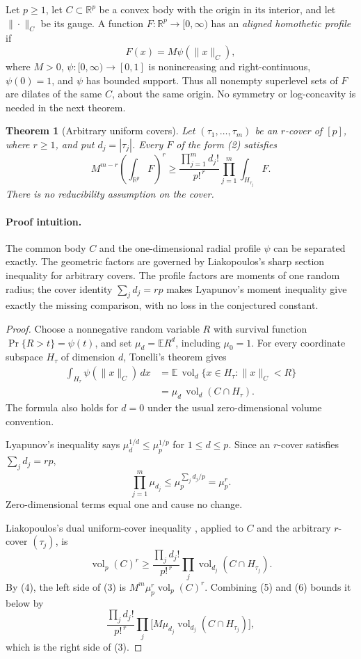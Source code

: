 \documentclass[11pt]{article}
\newtheorem{theorem}{Theorem}
\newcommand{\R}{\mathbb R}
\newcommand{\vol}{\operatorname{vol}}
\begin{document}
Let \(p\ge1\), let \(C\subset\R^p\) be a convex body with the origin in its
interior, and let \(\|\cdot\|_C\) be its gauge.  A function
\(F:\R^p\to[0,\infty)\) has an \emph{aligned homothetic profile} if
\[
 F(x)=M\psi(\|x\|_C), \tag{2}
\]
where \(M>0\), \(\psi:[0,\infty)\to[0,1]\) is nonincreasing and
right-continuous, \(\psi(0)=1\), and \(\psi\) has bounded support.  Thus all
nonempty superlevel sets of \(F\) are dilates of the same \(C\), about the
same origin.  No symmetry or log-concavity is needed in the next theorem.

\begin{theorem}[Arbitrary uniform covers]
\label{thm:functional}
Let \((\tau_1,\ldots,\tau_m)\) be an \(r\)-cover of \([p]\), where
\(r\ge1\), and put \(d_j=|\tau_j|\).  Every \(F\) of the form (2) satisfies
\[
 M^{m-r}\left(\int_{\R^p}F\right)^r
 \ge
 \frac{\prod_{j=1}^m d_j!}{p!^{\,r}}
 \prod_{j=1}^m\int_{H_{\tau_j}}F.
 \tag{3}
\]
There is no reducibility assumption on the cover.
\end{theorem}

\paragraph{Proof intuition.}
The common body \(C\) and the one-dimensional radial profile \(\psi\) can be
separated exactly.  The geometric factors are governed by Liakopoulos's
sharp section inequality for arbitrary covers.  The profile factors are
moments of one random radius; the cover identity
\(\sum_jd_j=rp\) makes Lyapunov's moment inequality give exactly the missing
comparison, with no loss in the conjectured constant.

\begin{proof}
Choose a nonnegative random variable \(R\) with survival function
\(\Pr\{R>t\}=\psi(t)\), and set
\(\mu_d=\mathbb E R^d\), including \(\mu_0=1\).  For every coordinate
subspace \(H_\tau\) of dimension \(d\), Tonelli's theorem gives
\[
\begin{aligned}
 \int_{H_\tau}\psi(\|x\|_C)\,dx
 &=\mathbb E\,\vol_d\{x\in H_\tau:\|x\|_C<R\}\\
 &=\mu_d\,\vol_d(C\cap H_\tau).
\end{aligned}
\tag{4}
\]
The formula also holds for \(d=0\) under the usual zero-dimensional volume
convention.

Lyapunov's inequality says
\(\mu_d^{1/d}\le\mu_p^{1/p}\) for \(1\le d\le p\).  Since an \(r\)-cover
satisfies \(\sum_jd_j=rp\),
\[
 \prod_{j=1}^m\mu_{d_j}
 \le \mu_p^{\sum_jd_j/p}=\mu_p^r. \tag{5}
\]
Zero-dimensional terms equal one and cause no change.

Liakopoulos's dual uniform-cover inequality \cite{Liakopoulos}, applied to
\(C\) and the arbitrary \(r\)-cover \((\tau_j)\), is
\[
 \vol_p(C)^r\ge
 \frac{\prod_jd_j!}{p!^{\,r}}
 \prod_j\vol_{d_j}(C\cap H_{\tau_j}). \tag{6}
\]
By (4), the left side of (3) is
\(M^m\mu_p^r\vol_p(C)^r\).  Combining (5) and (6) bounds it below by
\[
 \frac{\prod_jd_j!}{p!^{\,r}}
 \prod_j\bigl[M\mu_{d_j}
 \vol_{d_j}(C\cap H_{\tau_j})\bigr],
\]
which is the right side of (3).
\end{proof}
\end{document}
